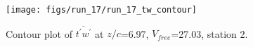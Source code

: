 \begin{figure}[H]
\centering
\texttt{[image: figs/run\_17/run\_17\_tw\_contour]}
\caption{Contour plot of $\overline{t^\prime w^\prime}$ at $z/c$=6.97, $V_{free}$=27.03, station 2.}
\label{fig:run_17_tw_contour}
\end{figure}


